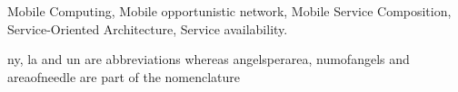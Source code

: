 \documentclass[journal]{IEEEtran}
\begin{document}
\begin{IEEEkeywords}
Mobile Computing, Mobile opportunistic network, Mobile Service Composition, Service-Oriented Architecture, Service availability.
\end{IEEEkeywords}

\ac{ny}, \ac{la} and \ac{un} are abbreviations whereas
\ac{angelsperarea}, \ac{numofangels} and \ac{areaofneedle} are part of the nomenclature

\printacronyms[include-classes=abbrev,name=Abbreviations]

\printacronyms[include-classes=nomencl,name=Nomenclature]

% 
% 
% 
% 
% 
\end{document}
